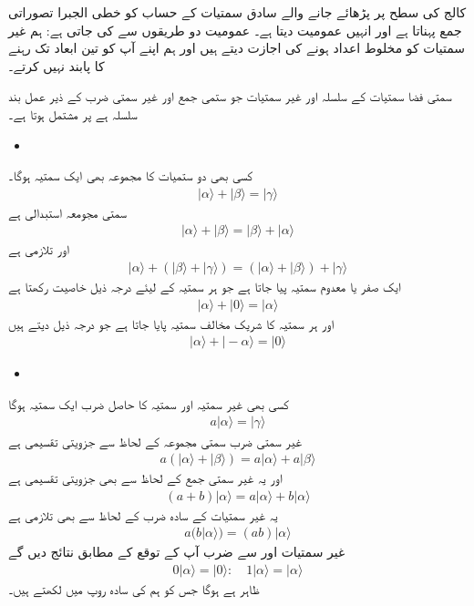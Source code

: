 
کالج کی سطح پر پڑھائے جانے والے سادق سمتیات کے حساب کو خطی الجبرا تصوراتی جمع پہناتا ہے اور انہیں عمومیت دیتا ہے۔ عمومیت دو طریقوں سے کی جاتی ہے:  ہم غیر سمتیات کو مخلوط اعداد ہونے کی اجازت دیتے ہیں اور  ہم اپنے آپ کو تین ابعاد تک رہنے کا پابند نہیں کرتے۔

سمتی فضا سمتیات  کے سلسلہ اور غیر سمتیات  جو ستمی جمع اور غیر سمتی ضرب کے ذیر عمل بند سلسلہ ہے پر مشتمل ہوتا ہے۔

\begin{itemize}
	\item {}
\end{itemize}
کسی بھی دو ستمیات کا مجموعہ بھی ایک سمتیہ ہوگا۔
\begin{align}
	|\alpha\rangle+|\beta\rangle=|\gamma\rangle
\end{align}
سمتی مجومعہ استبدالی ہے
\begin{align}
	|\alpha\rangle+|\beta\rangle = |\beta\rangle+|\alpha\rangle
\end{align}
اور تلازمی ہے
\begin{align}
	|\alpha\rangle+(|\beta\rangle+|\gamma\rangle)=(|\alpha\rangle+|\beta\rangle)+|\gamma\rangle
\end{align}
ایک صفر یا معدوم سمتیہ  پیا جاتا ہے جو ہر سمتیہ  کے لیئے درجہ ذیل خاصیت رکھتا ہے
\begin{align}
	|\alpha\rangle+|0\rangle=|\alpha\rangle
\end{align}
اور ہر سمتیہ  کا شریک مخالف سمتیہ  پایا جاتا ہے جو درجہ ذیل دیتے ہیں
\begin{align}
	|\alpha\rangle+|-\alpha\rangle = |0\rangle
\end{align}
\begin{itemize}
	\item {}
\end{itemize}
کسی بھی غیر سمتیہ اور سمتیہ کا حاصل ضرب ایک سمتیہ ہوگا
\begin{align}
	a|\alpha\rangle=|\gamma\rangle
\end{align}
غیر سمتی ضرب سمتی مجموعہ کے لحاظ سے جزویتی تقسیمی ہے 
\begin{align}
	a(|\alpha\rangle+|\beta\rangle)=a|\alpha\rangle+a|\beta\rangle
\end{align}
اور یہ غیر سمتی جمع کے لحاظ سے بھی جزویتی تقسیمی ہے
\begin{align}
	(a+b)|\alpha\rangle=a|\alpha\rangle+b|\alpha\rangle
\end{align}
یہ غیر سمتیات کے سادہ ضرب کے لحاظ سے بھی تلازمی ہے
\begin{align}
	a(b|\alpha\rangle)=(ab)|\alpha\rangle
\end{align}
غیر سمتیات  اور  سے ضرب آپ کے توقع کے مطابق نتائج دیں گے
\begin{align}
	0|\alpha\rangle=|0\rangle:\quad 1|\alpha\rangle=|\alpha\rangle
\end{align}
ظاہر ہے  ہوگا جس کو ہم  کی سادہ روپ میں لکھتے ہیں۔

